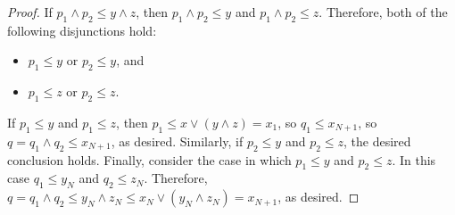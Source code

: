 \begin{proof}
If $p_1 \wedge p_2 \leq y \wedge z$, then 
$p_1 \wedge p_2 \leq y$ and $p_1 \wedge p_2 \leq z$. Therefore, both of the following disjunctions hold:
\begin{itemize}
  \item $p_1 \leq y$ or $p_2 \leq y$, and 
  \item $p_1 \leq z$ or $p_2 \leq z$. 
\end{itemize}
If $p_1 \leq y$ and $p_1 \leq z$, then $p_1 \leq x \vee (y\wedge z) = x_1$, so $q_1 \leq x_{N+1}$, so $q = q_1\wedge q_2 \leq x_{N+1}$, as desired.
Similarly, if $p_2 \leq y$ and $p_2 \leq z$, the desired conclusion holds.
Finally, consider the case in which $p_1 \leq y$ and $p_2 \leq z$. In this case $q_1 \leq y_N$ and $q_2 \leq z_N$.  Therefore, $q = q_1 \wedge q_2 \leq y_N \wedge z_N \leq x_N \vee (y_N\wedge z_N) = x_{N+1}$, as desired.
\end{proof}












































